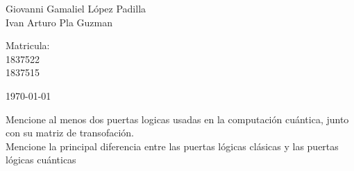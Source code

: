 \documentclass[12pt,letterpaper]{report}
\begin{document}
\begin{titlepage}
\begin{center}
\begin{minipage}{0.6\linewidth}
Giovanni Gamaliel López Padilla\\
Ivan Arturo Pla Guzman
\end{minipage}
\begin{minipage}{0.2\linewidth}
\changefontsizes{14pt} 
Matricula:\\                                                                                                                        
1837522\\
1837515
\end{minipage}
\end{center}
\vspace{4cm}
\begin{flushright}
\today
\end{flushright}
\end{titlepage}
Mencione al menos dos puertas logicas usadas en la computación cuántica, junto con su matriz de transofación.\\
Mencione la principal diferencia entre las puertas lógicas clásicas y las puertas lógicas cuánticas
\end{document}
